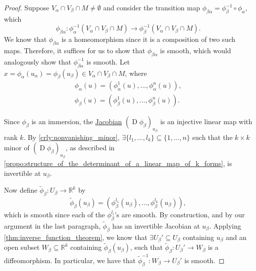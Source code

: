\documentclass[notoc,notitlepage]{tufte-book}
\DeclareMathOperator{\D}{D}
\begin{document}
\begin{proof}
  Suppose $V_\alpha \cap V_\beta \cap M \neq \emptyset$ and consider the
  transition map $\phi_{\beta \alpha} = \phi_{\beta}^{-1} \circ \phi_{\alpha}$,
  which
  \begin{equation*}
    \phi_{\beta \alpha} : \phi_{\alpha}^{-1} (V_\alpha \cap V_\beta \cap M) \to
    \phi_{\beta}^{-1} (V_\alpha \cap V_\beta \cap M).
  \end{equation*}
  We know that $\phi_{\beta \alpha}$ is a homeomorphism since it is a
  composition of two such maps. Therefore, it suffices for us to show that
  $\phi_{\beta \alpha}$ is smooth, which would analogously show that
  $\phi_{\beta \alpha}^{-1}$ is smooth. Let $x = \phi_\alpha(u_\alpha) =
  \phi_\beta(u_\beta) \in V_\alpha \cap V_\beta \cap M$, where
  \begin{gather*}
    \phi_\alpha(u) = (\phi^1_\alpha(u), \ldots, \phi^n_\alpha(u)), \\
    \phi_\beta(u) = (\phi^1_\beta(u), \ldots, \phi^n_\beta(u)).
  \end{gather*}
  
  Since $\phi_\beta$ is an immersion, the \hyperref[defn:differential]{Jacobian}
  $(\D \phi_\beta)_{u_\beta}$ is an injective linear map with rank $k$. By
  \cref{crly:nonvanishing_minor}, $\exists \{ l_1, \ldots, l_k \} \subseteq \{
  1, \ldots, n \}$ such that the $k \times k$ minor of $(\D \phi_\beta)_{u_\beta}$,
  as described in
  \cref{propo:structure_of_the_determinant_of_a_linear_map_of_k_forms}, is
  invertible at $u_\beta$.

  Now define $\tilde{\phi}_\beta : U_\beta \to \mathbb{R}^k$ by
  \begin{equation*}
    \tilde{\phi}_\beta (u_\beta) = \left( \phi_{\beta}^{l_1} (u_\beta), \ldots,
    \phi_{\beta}^{l_k} (u_\beta) \right),
  \end{equation*}
  which is smooth since each of the $\phi_{\beta}^{l_i}$'s are smooth. By
  construction, and by our argument in the last paragraph, $\tilde{\phi}_\beta$
  has an invertible Jacobian at $u_\beta$. Applying
  \cref{thm:inverse_function_theorem}, we know that $\exists U_\beta' \subseteq
  U_\beta$ containing $u_\beta$ and an open subset $W_\beta \subseteq
  \mathbb{R}^k$ containing $\tilde{\phi}_{\beta} (u_\beta)$, such that
  $\tilde{\phi}_{\beta} : U_\beta' \to W_\beta$ is a diffeomorphism. In
  particular, we have that $\tilde{\phi}_{\beta}^{-1} : W_\beta \to U_\beta'$ is
  smooth.


\end{proof}
\end{document}

